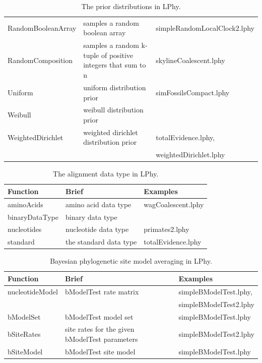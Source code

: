 \documentclass[12pt]{article} %
\begin{document}
\begin{table}
\begin{tabular}{ l | p{7cm} | l }
    RandomBooleanArray & samples a random boolean array & simpleRandomLocalClock2.lphy\\  
    RandomComposition & samples a random k-tuple of positive integers that sum to n & skylineCoalescent.lphy\\  
    Uniform & uniform distribution prior & simFossilsCompact.lphy\\  
    Weibull & weibull distribution prior & \\  
    WeightedDirichlet & weighted dirichlet distribution prior & totalEvidence.lphy, \\ & & weightedDirichlet.lphy\\  
    \hline
\end{tabular}

\label{tab:prior}
\caption{The prior distributions in LPhy.}
\end{table}

\begin{table}
\begin{tabular}{ l | l | l }
    \hline\hline
    Function & Brief & Examples \\ 
    \hline\hline
    aminoAcids & amino acid data type & wagCoalescent.lphy\\  
    binaryDataType & binary data type & \\  
    nucleotides & nucleotide data type & primates2.lphy\\  
    standard & the standard data type & totalEvidence.lphy\\  
    \hline
\end{tabular}
\label{tab:coalescent}
\caption{The alignment data type in LPhy.}
\end{table}

\begin{table}
\begin{tabular}{ l | l | l }
    \hline\hline
    Function & Brief & Examples \\ 
    \hline\hline
    nucleotideModel & bModelTest\cite{bouckaert2017bmodeltestcomparison} rate matrix & simpleBModelTest.lphy, \\ & & simpleBModelTest2.lphy\\  
    bModelSet & bModelTest model set & simpleBModelTest.lphy\\  
    bSiteRates & site rates for the given bModelTest parameters & simpleBModelTest2.lphy\\  
    bSiteModel & bModelTest site model & simpleBModelTest.lphy\\  
        \hline
\end{tabular}
\label{tab:coalescent}
\caption{Bayesian phylogenetic site model averaging in LPhy.}
\end{table}

\clearpage




\end{document}
